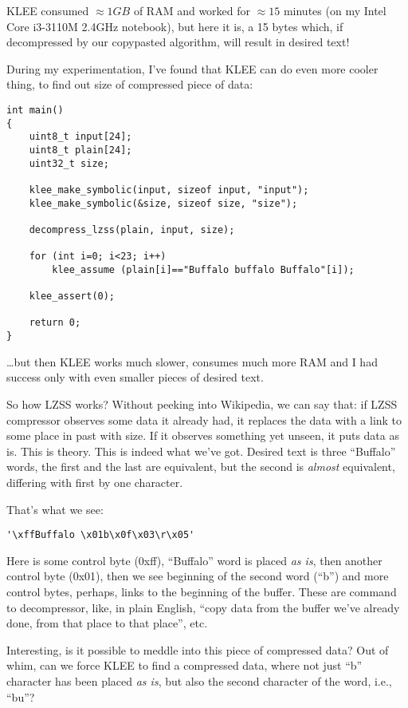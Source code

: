 KLEE consumed $\approx 1GB$ of RAM and worked for $\approx 15$ minutes (on my Intel Core i3-3110M 2.4GHz notebook), 
but here it is, a 15 bytes which, if decompressed by our copypasted algorithm, will result in desired text!

During my experimentation, I've found that KLEE can do even more cooler thing, to find out size of compressed piece of data:

\begin{lstlisting}
int main()
{
	uint8_t input[24];
	uint8_t plain[24];
	uint32_t size;
  
	klee_make_symbolic(input, sizeof input, "input");
	klee_make_symbolic(&size, sizeof size, "size");
	
	decompress_lzss(plain, input, size);

	for (int i=0; i<23; i++)
		klee_assume (plain[i]=="Buffalo buffalo Buffalo"[i]);

	klee_assert(0);
	
	return 0;
}
\end{lstlisting}

\dots but then KLEE works much slower, consumes much more RAM and I had success only with even smaller pieces of desired text.

So how \ac{LZSS} works? Without peeking into Wikipedia, we can say that: 
if \ac{LZSS} compressor observes some data it already had, it replaces the data with a link to some place in past with size. 
If it observes something yet unseen, it puts data as is.
This is theory.
This is indeed what we've got. Desired text is three ``Buffalo'' words, the first and the last are equivalent, but the second is \textit{almost} equivalent, 
differing with first by one character.

That's what we see:

\begin{lstlisting}
'\xffBuffalo \x01b\x0f\x03\r\x05'
\end{lstlisting}

Here is some control byte (0xff), ``Buffalo'' word is placed \textit{as is}, then another control byte (0x01), 
then we see beginning of the second word (``b'') and more
control bytes, perhaps, links to the beginning of the buffer.
These are command to decompressor, like, in plain English, ``copy data from the buffer we've already done, from that place to that place'', etc.

Interesting, is it possible to meddle into this piece of compressed data?
Out of whim, can we force KLEE to find a compressed data, where not just ``b'' character has been placed \textit{as is},
but also the second character of the word, i.e., ``bu''?

